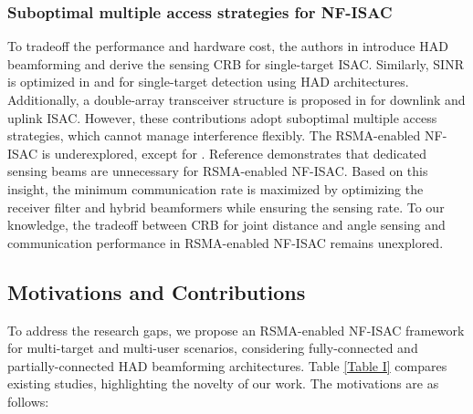 \documentclass[10pt,journal,twocolumn]{IEEEtran}
\begin{document}
 \subsubsection{Suboptimal multiple access strategies for NF-ISAC} To tradeoff the performance and hardware cost, the authors in \cite{10135096} introduce HAD beamforming and derive the sensing CRB for single-target ISAC. Similarly, SINR is optimized in \cite{meng2024hybrid} and \cite{10700785} 
 for single-target detection using HAD architectures. Additionally, a double-array transceiver structure is proposed in \cite{10579914}  for downlink and uplink ISAC. However, these contributions adopt suboptimal multiple access strategies, which cannot manage interference flexibly\cite{10135096, meng2024hybrid, 10700785, 10579914}. The RSMA-enabled NF-ISAC is underexplored, except for \cite{zhou2024hybrid}. Reference \cite{zhou2024hybrid} demonstrates that dedicated sensing beams are unnecessary for RSMA-enabled NF-ISAC. Based on this insight, the minimum communication rate is maximized by optimizing the receiver filter and hybrid beamformers while ensuring the sensing rate. To our knowledge, the tradeoff between CRB for joint distance and angle sensing and communication performance in RSMA-enabled NF-ISAC remains unexplored.

\subsection{Motivations and Contributions}
To address the research gaps, we propose an RSMA-enabled NF-ISAC framework for multi-target and multi-user scenarios, considering fully-connected and partially-connected HAD beamforming architectures. Table \ref{Table I} compares existing studies, highlighting the novelty of our work. The motivations are as follows: 
\end{document}
